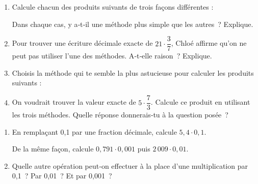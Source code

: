 
\begin{activite}

\begin{partie}
\begin{enumerate}
 \item Calcule chacun des produits suivants de trois façons différentes :
   \vspace{0.3cm}
Dans chaque cas, y a‑t‑il une méthode plus simple que les autres ? Explique.
 \item Pour trouver une écriture décimale exacte de $21 \cdot \dfrac{3}{7}$, Chloé affirme qu'on ne peut pas utiliser l'une des méthodes. A‑t‑elle raison ? Explique.
 \item Choisis la méthode qui te semble la plus astucieuse pour calculer les produits suivants :
 \item On voudrait trouver la valeur exacte de $5 \cdot \dfrac{7}{3}$. Calcule ce produit en utilisant les trois méthodes. Quelle réponse donnerais‑tu à la question posée ?
 \end{enumerate}
\end{partie}

\newpage


\begin{partie}
\begin{enumerate}
 \item En remplaçant 0,1 par une fraction décimale, calcule $5,4 \cdot 0,1$.
 
De la même façon, calcule $0,791 \cdot 0,001$ puis $2\,009 \cdot 0,01$.
 \item Quelle autre opération peut‑on effectuer à la place d'une multiplication par 0,1 ? Par 0,01 ? Et par 0,001 ?
 \end{enumerate}
\end{partie}


\end{activite}
